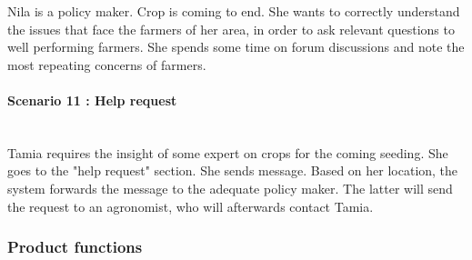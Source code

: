 Nila is a policy maker. Crop is coming to end. She wants to correctly understand the issues that face the farmers of her area, in order to ask relevant questions to well performing farmers. She spends some time on forum discussions and note the most repeating concerns of farmers.

\paragraph{Scenario 11 : Help request}\mbox{} \\

Tamia requires the insight of some expert on crops for the coming seeding. She goes to the "help request" section. She sends message. Based on her location, the system forwards the message to the adequate policy maker. The latter will send the request to an agronomist, who will afterwards contact Tamia.

\subsubsection{Product functions}


